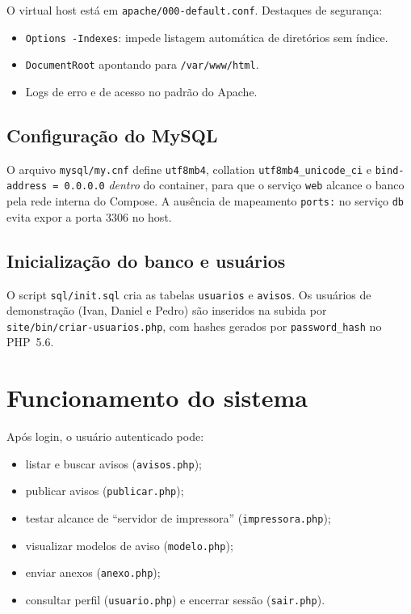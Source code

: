   O virtual host está em \texttt{apache/000-default.conf}. Destaques de segurança:
  
  \begin{itemize}
      \item \texttt{Options -Indexes}: impede listagem automática de diretórios sem índice.
      \item \texttt{DocumentRoot} apontando para \texttt{/var/www/html}.
      \item Logs de erro e de acesso no padrão do Apache.
  \end{itemize}
  
  \subsection{Configuração do MySQL}
  
  O arquivo \texttt{mysql/my.cnf} define \texttt{utf8mb4}, collation \texttt{utf8mb4\_unicode\_ci} e
  \texttt{bind-address = 0.0.0.0} \emph{dentro} do container, para que o serviço \texttt{web} alcance o
  banco pela rede interna do Compose. A ausência de mapeamento \texttt{ports:} no serviço \texttt{db}
  evita expor a porta 3306 no host.
  
  \subsection{Inicialização do banco e usuários}
  
  O script \texttt{sql/init.sql} cria as tabelas \texttt{usuarios} e \texttt{avisos}. Os usuários de
  demonstração (Ivan, Daniel e Pedro) são inseridos na subida por \texttt{site/bin/criar-usuarios.php},
  com hashes gerados por \texttt{password\_hash} no PHP~5.6.
  
  \section{Funcionamento do sistema}\label{sec:func}
  
  Após login, o usuário autenticado pode:
  
  \begin{itemize}
      \item listar e buscar avisos (\texttt{avisos.php});
      \item publicar avisos (\texttt{publicar.php});
      \item testar alcance de ``servidor de impressora'' (\texttt{impressora.php});
      \item visualizar modelos de aviso (\texttt{modelo.php});
      \item enviar anexos (\texttt{anexo.php});
      \item consultar perfil (\texttt{usuario.php}) e encerrar sessão (\texttt{sair.php}).
  \end{itemize}
  
